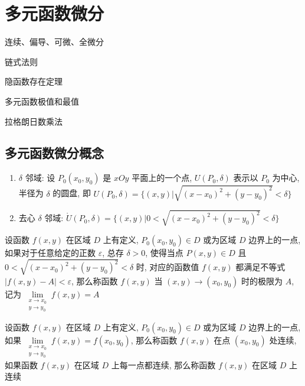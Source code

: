 \chapter{多元函数微分}
\begin{introduction}
	\item 连续、偏导、可微、全微分
	\item 链式法则
	\item 隐函数存在定理
	\item 多元函数极值和最值
	\item 拉格朗日数乘法
\end{introduction}
\section{多元函数微分概念}
\begin{definition}[邻域]
	\begin{enumerate}
		\item $\delta$ 邻域: 设 $P_{0}(x_{0},y_{0})$ 是 $xOy$ 平面上的一个点, $U(P_{0},\delta)$ 表示以 $P_{0}$ 为中心, 
		半径为 $\delta$ 的圆盘, 即 $U(P_{0},\delta) = \{(x,y)|\sqrt{(x-x_{0})^{2}+(y-y_{0})^{2}}<\delta\}$
		\item 去心 $\delta$ 邻域: $\mathring{U}(P_{0},\delta) = \{(x,y)|0<\sqrt{(x-x_{0})^{2}+(y-y_{0})^{2}}<\delta\}$
	\end{enumerate}
\end{definition}
\begin{definition}[多元函数极限]
	设函数 $f(x,y)$ 在区域 $D$ 上有定义, $P_{0}(x_{0},y_{0})\in D$ 或为区域 $D$ 边界上的一点, 如果对于任意给定的正数 $\varepsilon$,
总存 $\delta>0$, 使得当点 $P(x,y)\in D$ 且 $0<\sqrt{(x-x_{0})^{2}+(y-y_{0})^{2}}<\delta$ 时, 对应的函数值 $f(x,y)$ 都满足不等式 
$|f(x,y)-A|<\varepsilon$, 那么称函数 $f(x,y)$ 当 $(x,y)\to(x_{0},y_{0})$ 时的极限为 $A$, 记为 $\lim\limits_{\substack{x\to x_{0}\\y\to y_{0}}}f(x,y)=A$
\end{definition}
\begin{definition}[连续]\label{def: 多元微分学概念: 连续、偏导、可微}
	设函数 $f(x,y)$ 在区域 $D$ 上有定义, $P_{0}(x_{0},y_{0})\in D$ 或为区域 $D$ 边界上的一点, 如果 $\lim\limits_{\substack{x\to x_{0}\\y\to y_{0}}}f(x,y)=f(x_{0},y_{0})$, 
那么称函数 $f(x,y)$ 在点 $(x_{0},y_{0})$ 处连续, 如果函数 $f(x,y)$ 在区域 $D$ 上每一点都连续, 那么称函数 $f(x,y)$ 在区域 $D$ 上连续
\end{definition}
